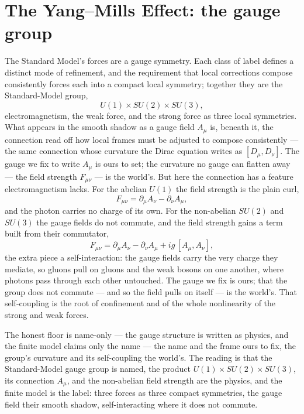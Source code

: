 \section{The Yang--Mills Effect: the gauge group}
\label{se:yang-mills}

The Standard Model's forces are a gauge symmetry. Each class of label defines a distinct mode of refinement,
and the requirement that local corrections compose consistently forces each into a compact local symmetry;
together they are the Standard-Model group,
\begin{equation}
  U(1) \times SU(2) \times SU(3),
\end{equation}
electromagnetism, the weak force, and the strong force as three local symmetries. What appears in the smooth
shadow as a gauge field $A_\mu$ is, beneath it, the connection read off how local frames must be adjusted to
compose consistently --- the same connection whose curvature the Dirac equation writes as $[D_\mu, D_\nu]$. The
gauge we fix to write $A_\mu$ is ours to set; the curvature no gauge can flatten away --- the field strength
$F_{\mu\nu}$ --- is the world's. But here the connection has a feature electromagnetism lacks. For the abelian $U(1)$ the field strength is the
plain curl,
\begin{equation}
  F_{\mu\nu} = \partial_\mu A_\nu - \partial_\nu A_\mu,
\end{equation}
and the photon carries no charge of its own. For the non-abelian $SU(2)$ and $SU(3)$ the gauge fields do not
commute, and the field strength gains a term built from their commutator,
\begin{equation}
  F_{\mu\nu} = \partial_\mu A_\nu - \partial_\nu A_\mu + ig\,[A_\mu, A_\nu],
\end{equation}
the extra piece a self-interaction: the gauge fields carry the very charge they mediate, so gluons pull on
gluons and the weak bosons on one another, where photons pass through each other untouched. The gauge we fix is
ours; that the group does not commute --- and so the field pulls on itself --- is the world's. That
self-coupling is the root of confinement and of the whole nonlinearity of the strong and weak forces.

The honest floor is name-only --- the gauge structure is written as physics, and the finite model claims only
the name --- the name and the frame ours to fix, the group's curvature and its self-coupling the world's. The
reading is that the Standard-Model gauge group is named, the product $U(1) \times SU(2) \times
SU(3)$, its connection $A_\mu$, and the non-abelian field strength are the physics, and the finite model is the
label: three forces as three compact symmetries, the gauge field their smooth shadow, self-interacting where it
does not commute.


